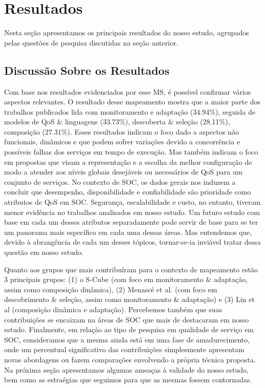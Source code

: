 \section{Resultados}\label{sec:resultados}

Nesta se\c c\~{a}o apresentamos os principais resultados do nosso
estudo, agrupados pelas quest\~{o}es de pesquisa discutidas na se\c
c\~{a}o anterior. 






\subsection{Discuss\~{a}o Sobre os Resultados}

Com base nos resultados evidenciados por esse MS, \'{e} poss\'{i}vel
confirmar v\'{a}rios aspectos relevantes. O resultado desse mapeamento
mostra que a maior parte dos trabalhos publicados lida com
monitoramento e adapta\c{c}\~{a}o (34.94\%), seguida de modelos de QoS
\& linguagens (33.73\%), descoberta \& sele\c{c}\~{a}o (28.11\%),
composi\c{c}\~{a}o (27.31\%). Esses resultados indicam o foco dado a
aspectos n\~{a}o funcionais, din\^{a}micos e que podem sofrer
varia\c{c}\~{o}es devido a concorrência e possíveis falhas dos
servi\c{c}os em tempo de execu\c{c}\~{a}o. Mas tamb\'{e}m indicam o
foco em propostas que visam a representa\c{c}\~{a}o e a escolha da
melhor configura\c{c}\~{a}o de modo a atender aos níveis globais
desej\'{a}veis ou necess\'{a}rios de QoS para um conjunto de
servi\c{c}os. 
No contexto de SOC, os dados gerais nos induzem a
concluir que desempenho, disponibilidade e confiabilidade s\~{a}o
prioridade como atributos de QoS em SOC. Seguran\c{c}a,
escalabilidade e custo, no entanto, tiveram menor evid\^{e}ncia no trabalhos analisados em nosso estudo. 
Um futuro estudo com base em cada um desses atributos separadamente pode servir de base para se ter um panorama
mais espec\'{i}fico em cada uma dessas \'{a}reas. Mas entendemos que, devido \`{a} abrang\^{e}ncia de cada um desses t\'{o}picos,
tornar-se-ia invi\'{a}vel tratar dessa quest\~{a}o em nosso estudo. 

Quanto aos grupos que mais contribu\'{i}ram para o contexto de
mapeamento est\~{a}o 3 principais grupos: (1) o S-Cube (com foco em
monitoramento \& adapta\c{c}\~{a}o, assim como composi\c{c}\~{a}o
din\^{a}mica), (2) Menasc\'{e} et al. (com foco em descobrimento \&
sele\c{c}\~{a}o, assim como monitoramento \& adapta\c{c}\~{a}o) e (3)
Lin et al (composi\c{c}\~{a}o din\^{a}mica e
adapta\c{c}\~{a}o). Percebemos tamb\'{e}m que suas
contribui\c{c}\~{o}es se encaixam na \'{a}reas de SOC que mais de
destacaram em nosso estudo. 
Finalmente, em rela\c c\~{a}o ao tipo de pesquisa em
qualidade de servi\c{c}o em SOC, consideramos que a mesma ainda
est\'{a} em uma fase de amadurecimento, 
onde um percentual significativo das contribui\c{c}\~{o}es
simplesmente apresentam 
novas abordagens ou fazem compara\c{c}\~{o}es envolvendo a 
própria t\'{e}cnica proposta. Na pr\'{o}xima se\c c\~{a}o apresentamos
algumas amea\c cas \`{a} validade do nosso estudo, bem como as
estra\'{e}gias que seguimos para que as mesmas
fossem contornadas.

